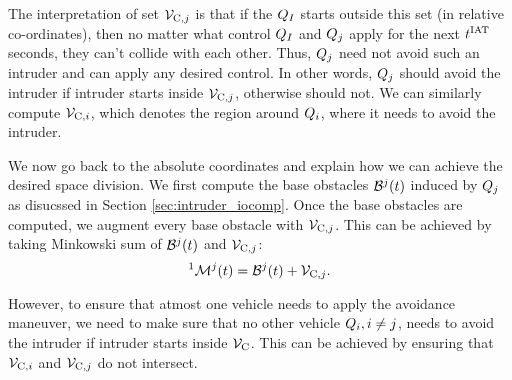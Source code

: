 The interpretation of set $\mathcal{V}_{\text{C},j}$ is that if the $Q_{I}$ starts outside this set (in relative co-ordinates), then no matter what control $Q_{I}$ and $Q_{j}$ apply for the next $t^\text{IAT}$ seconds, they can't collide with each other. Thus, $Q_{j}$ need not avoid such an intruder and can apply any desired control. In other words, $Q_{j}$ should avoid the intruder if intruder starts inside $\mathcal{V}_{\text{C},j}$, otherwise should not. We can similarly compute $\mathcal{V}_{\text{C},i}$, which denotes the region around $Q_{i}$, where it needs to avoid the intruder. 

We now go back to the absolute coordinates and explain how we can achieve the desired space division. We first compute the base obstacles $\mathcal{B}^j(t)$ induced by $Q_{j}$ as disucssed in Section \ref{sec:intruder_iocomp}. Once the base obstacles are computed, we augment every base obstacle with $\mathcal{V}_{\text{C},j}$. This can be achieved by taking Minkowski sum of $\mathcal{B}^j(t)$ and $\mathcal{V}_{\text{C},j}$:
\begin{equation}
^1\mathcal{M}^j(t) = \mathcal{B}^j(t) + \mathcal{V}_{\text{C},j}.
\end{equation}


However, to ensure that atmost one vehicle needs to apply the avoidance maneuver, we need to make sure that no other vehicle $Q_{i}, i \neq j$, needs to avoid the intruder if intruder starts inside $\mathcal{V}_\text{C}$. This can  be achieved by ensuring that $\mathcal{V}_{\text{C},i}$ and $\mathcal{V}_{\text{C},j}$ do not intersect.